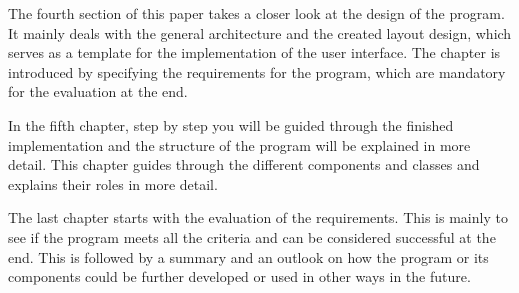 The fourth section of this paper takes a closer look at the design of the program. It mainly deals with the general architecture and the created layout design, which serves as a template for the implementation of the user interface. The chapter is introduced by specifying the requirements for the program, which are mandatory for the evaluation at the end.

In the fifth chapter, step by step you will be guided through the finished implementation and the structure of the program will be explained in more detail. This chapter guides through the different components and classes and explains their roles in more detail.

The last chapter starts with the evaluation of the requirements. This is mainly to see if the program meets all the criteria and can be considered successful at the end. This is followed by a summary and an outlook on how the program or its components could be further developed or used in other ways in the future.